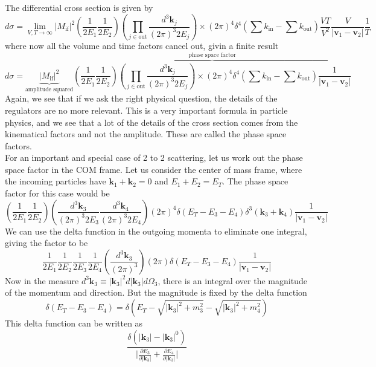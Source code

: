 \documentclass[11pt, notitlepage]{report}
\newcommand{\del}{\partial}
\numberwithin{equation}{section}
\begin{document}
    The differential cross section is given by 
    \begin{equation*}
        d\sigma = \lim_{V,T\to \infty} |M_{\text{if}}|^2 \left(\frac{1}{2E_1}\frac{1}{2E_2} \right)\left(\prod_{j\in\text{out}}\frac{d^3\textbf{k}_j}{(2\pi)^3 2E_j}\right) \times (2\pi)^4\delta^4\left(\sum k_{\text{in}} - \sum k_{\text{out}} \right)\frac{VT}{V^2}  \frac{V}{|\textbf{v}_1 - \textbf{v}_2|}\frac{1}{T}
    \end{equation*}
    where now all the volume and time factors cancel out, givin a finite result
    \begin{equation*}
        d\sigma =  \underbrace{|M_{\text{if}}|^2}_{\text{amplitude squared}}\overbrace{\left(\frac{1}{2E_1}\frac{1}{2E_2} \right)\left(\prod_{j\in\text{out}}\frac{d^3\textbf{k}_j}{(2\pi)^3 2E_j}\right) \times (2\pi)^4\delta^4\left(\sum k_{\text{in}} - \sum k_{\text{out}}\right)\frac{1}{|\textbf{v}_1 - \textbf{v}_2|}}^{\text{phase space factor}}
    \end{equation*}
    Again, we see that if we ask the right physical question, the details of the regulators are no more relevant. This is a very important formula in particle physics, and we see that a lot of the details of the cross section comes from the kinematical factors and not the amplitude. These are called the phase space factors.\\

    For an important and special case of 2 to 2 scattering, let us work out the phase space factor in the COM frame.
    Let us consider the center of mass frame, where the incoming particles have \(\textbf{k}_1 + \textbf{k}_2 = 0\) and \(E_1 + E_2 = E_T\). The phase space factor for this case would be 
    \begin{equation*}
            \left(\frac{1}{2E_1}\frac{1}{2E_2} \right)\left(\frac{d^3\textbf{k}_3}{(2\pi)^3 2E_3}\frac{d^3\textbf{k}_4}{(2\pi)^3 2E_4}\right)(2\pi)^4\delta(E_T - E_3 - E_4)\delta^3\left(\textbf{k}_3 + \textbf{k}_4\right)\frac{1}{|\textbf{v}_1 - \textbf{v}_2|}
    \end{equation*}
    We can use the delta function in the outgoing momenta to eliminate one integral, giving the factor to be 
    \begin{equation*}
        \frac{1}{2E_1}\frac{1}{2E_2}\frac{1}{2E_3}\frac{1}{2E_4}\left(\frac{d^3\textbf{k}_3}{(2\pi)^3}\right)(2\pi)\delta(E_T - E_3 - E_4)\frac{1}{|\textbf{v}_1 - \textbf{v}_2|}
    \end{equation*}
    Now in the measure \(d^3\textbf{k}_3 \equiv |\textbf{k}_3|^2 d|\textbf{k}_3| d\Omega_3\), there is an integral over the magnitude of the momentum and direction. But the magnitude is fixed by the delta function 
    \begin{equation*}
        \delta(E_T - E_3 - E_4) = \delta\left(E_T - \sqrt{|\textbf{k}_3|^2 + m_3^2} - \sqrt{|\textbf{k}_3|^2 + m_4^2}\right)
    \end{equation*}
    This delta function can be written as 
    \begin{equation*}
        \displaystyle \frac{\delta\left(|\textbf{k}_3| - |\textbf{k}_3|^0\right)}{\bigg|\displaystyle \frac{\del E_3}{\del |\textbf{k}_3|} + \frac{\del E_4}{\del |\textbf{k}_3|}\bigg|}
    \end{equation*}
\end{document}
